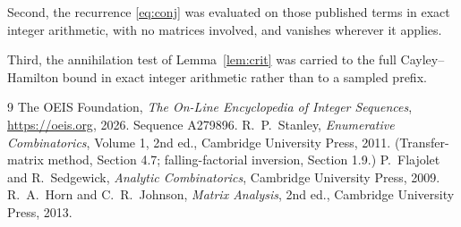 \documentclass[11pt,a4paper]{article}
\theoremstyle{plain}
\theoremstyle{definition}
\begin{document}
Second, the recurrence \eqref{eq:conj} was evaluated on those published terms in exact
integer arithmetic, with no matrices involved, and vanishes wherever it applies.

Third, the annihilation test of Lemma~\ref{lem:crit} was carried to the full
Cayley--Hamilton bound in exact integer arithmetic rather than to a sampled prefix.

\begin{thebibliography}{9}
 The OEIS Foundation, \emph{The On-Line Encyclopedia of Integer
Sequences}, \url{https://oeis.org}, 2026. Sequence A279896.
 R.~P.~Stanley, \emph{Enumerative Combinatorics}, Volume 1, 2nd ed.,
Cambridge University Press, 2011. (Transfer-matrix method, Section 4.7; falling-factorial
inversion, Section 1.9.)
 P.~Flajolet and R.~Sedgewick, \emph{Analytic Combinatorics}, Cambridge
University Press, 2009.
 R.~A.~Horn and C.~R.~Johnson, \emph{Matrix Analysis}, 2nd ed., Cambridge
University Press, 2013.
\end{thebibliography}
\end{document}
